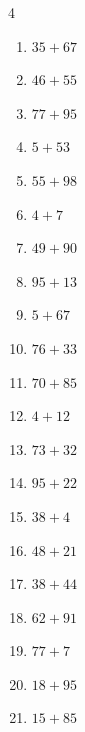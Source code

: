 \begin{multicols}{4}
\begin{enumerate}
  \item $35+67$
        \phantom{$=102$}

  \item $46+55$
        \phantom{$=101$}

  \item $77+95$
        \phantom{$=172$}

  \item $5+53$
        \phantom{$=58$}

  \item $55+98$
        \phantom{$=153$}

  \item $4+7$
        \phantom{$=11$}

  \item $49+90$
        \phantom{$=139$}

  \item $95+13$
        \phantom{$=108$}

  \item $5+67$
        \phantom{$=72$}

  \item $76+33$
        \phantom{$=109$}

  \item $70+85$
        \phantom{$=155$}

  \item $4+12$
        \phantom{$=16$}

  \item $73+32$
        \phantom{$=105$}

  \item $95+22$
        \phantom{$=117$}

  \item $38+4$
        \phantom{$=42$}

  \item $48+21$
        \phantom{$=69$}

  \item $38+44$
        \phantom{$=82$}

  \item $62+91$
        \phantom{$=153$}

  \item $77+7$
        \phantom{$=84$}

\columnbreak %

  \item $18+95$
        \phantom{$=113$}

  \item $15+85$
        \phantom{$=100$}


\end{enumerate}
\end{multicols}

